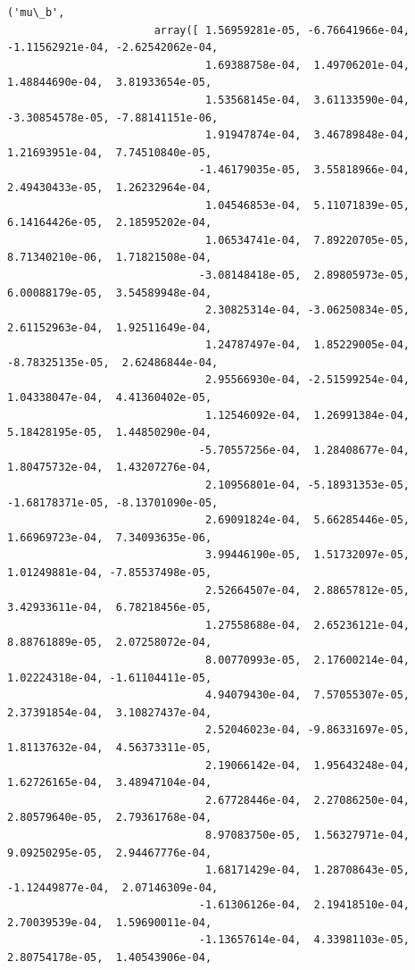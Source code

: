 \documentclass[11pt]{article}
\begin{document}
\begin{Verbatim}[commandchars=\\\{\}]
                      ('mu\_b',
                       array([ 1.56959281e-05, -6.76641966e-04, -1.11562921e-04, -2.62542062e-04,
                               1.69388758e-04,  1.49706201e-04,  1.48844690e-04,  3.81933654e-05,
                               1.53568145e-04,  3.61133590e-04, -3.30854578e-05, -7.88141151e-06,
                               1.91947874e-04,  3.46789848e-04,  1.21693951e-04,  7.74510840e-05,
                              -1.46179035e-05,  3.55818966e-04,  2.49430433e-05,  1.26232964e-04,
                               1.04546853e-04,  5.11071839e-05,  6.14164426e-05,  2.18595202e-04,
                               1.06534741e-04,  7.89220705e-05,  8.71340210e-06,  1.71821508e-04,
                              -3.08148418e-05,  2.89805973e-05,  6.00088179e-05,  3.54589948e-04,
                               2.30825314e-04, -3.06250834e-05,  2.61152963e-04,  1.92511649e-04,
                               1.24787497e-04,  1.85229005e-04, -8.78325135e-05,  2.62486844e-04,
                               2.95566930e-04, -2.51599254e-04,  1.04338047e-04,  4.41360402e-05,
                               1.12546092e-04,  1.26991384e-04,  5.18428195e-05,  1.44850290e-04,
                              -5.70557256e-04,  1.28408677e-04,  1.80475732e-04,  1.43207276e-04,
                               2.10956801e-04, -5.18931353e-05, -1.68178371e-05, -8.13701090e-05,
                               2.69091824e-04,  5.66285446e-05,  1.66969723e-04,  7.34093635e-06,
                               3.99446190e-05,  1.51732097e-05,  1.01249881e-04, -7.85537498e-05,
                               2.52664507e-04,  2.88657812e-05,  3.42933611e-04,  6.78218456e-05,
                               1.27558688e-04,  2.65236121e-04,  8.88761889e-05,  2.07258072e-04,
                               8.00770993e-05,  2.17600214e-04,  1.02224318e-04, -1.61104411e-05,
                               4.94079430e-04,  7.57055307e-05,  2.37391854e-04,  3.10827437e-04,
                               2.52046023e-04, -9.86331697e-05,  1.81137632e-04,  4.56373311e-05,
                               2.19066142e-04,  1.95643248e-04,  1.62726165e-04,  3.48947104e-04,
                               2.67728446e-04,  2.27086250e-04,  2.80579640e-05,  2.79361768e-04,
                               8.97083750e-05,  1.56327971e-04,  9.09250295e-05,  2.94467776e-04,
                               1.68171429e-04,  1.28708643e-05, -1.12449877e-04,  2.07146309e-04,
                              -1.61306126e-04,  2.19418510e-04,  2.70039539e-04,  1.59690011e-04,
                              -1.13657614e-04,  4.33981103e-05,  2.80754178e-05,  1.40543906e-04,

\end{Verbatim}
\end{document}
